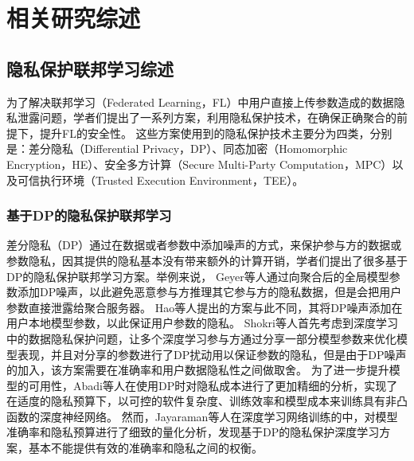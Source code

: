 \chapter{相关研究综述}
\label{chap:main}

\section{隐私保护联邦学习综述}
\label{sec:ppfl}
为了解决联邦学习（Federated Learning，FL）中用户直接上传参数造成的数据隐私泄露问题，学者们提出了一系列方案，利用隐私保护技术，在确保正确聚合的前提下，提升FL的安全性。
这些方案使用到的隐私保护技术主要分为四类，分别是：差分隐私（Differential Privacy，DP）\cite{dwork2006differential}、同态加密（Homomorphic Encryption，HE）\cite{gentry2013homomorphic}、安全多方计算（Secure Multi-Party Computation，MPC）\cite{shamir1979share}以及可信执行环境（Trusted Execution Environment，TEE）\cite{sabt2015trusted}。

\subsection{基于DP的隐私保护联邦学习}
差分隐私（DP）通过在数据或者参数中添加噪声的方式，来保护参与方的数据或参数隐私，因其提供的隐私基本没有带来额外的计算开销，学者们提出了很多基于DP的隐私保护联邦学习方案\cite{agarwal2018cpsgd, choudhury2019differential, dubey2020differentially, geyer2017differentially, hao2019efficient, hao2019towards, hu2020personalized, rodriguez2020federated, triastcyn2019federated, wei2020federated}。举例来说，
Geyer等人\cite{geyer2017differentially}通过向聚合后的全局模型参数添加DP噪声，以此避免恶意参与方推理其它参与方的隐私数据，但是会把用户参数直接泄露给聚合服务器。
Hao等人\cite{hao2019efficient}提出的方案与此不同，其将DP噪声添加在用户本地模型参数，以此保证用户参数的隐私。
Shokri等人\cite{shokri2015privacy}首先考虑到深度学习中的数据隐私保护问题，让多个深度学习参与方通过分享一部分模型参数来优化模型表现，并且对分享的参数进行了DP扰动用以保证参数的隐私，但是由于DP噪声的加入，该方案需要在准确率和用户数据隐私性之间做取舍。
为了进一步提升模型的可用性，Abadi等人\cite{abadi2016deep}在使用DP时对隐私成本进行了更加精细的分析，实现了在适度的隐私预算下，以可控的软件复杂度、训练效率和模型成本来训练具有非凸函数的深度神经网络。
然而，Jayaraman等人\cite{jayaraman2019evaluating}在深度学习网络训练的中，对模型准确率和隐私预算进行了细致的量化分析，发现基于DP的隐私保护深度学习方案，基本不能提供有效的准确率和隐私之间的权衡。

